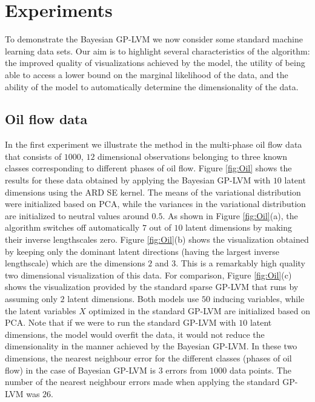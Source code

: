 \documentclass[twoside,times]{article}
\begin{document}
\section{Experiments  \label{sec:experiments}} 

To demonstrate the Bayesian GP-LVM 
we now consider some standard machine learning data sets. Our aim is
 to highlight several characteristics of the algorithm: the improved quality of
visualizations achieved by the model, the utility of being able to
access a lower bound on the marginal likelihood of the data, and the
ability of the model to automatically determine the dimensionality of
the data. 

\subsection{Oil flow data}

In the first experiment we illustrate the method in the multi-phase oil
flow data \citep{Bishop:oil93} that consists of $1000$, $12$ 
dimensional observations belonging to three known classes
corresponding to different phases of oil flow.   
Figure \ref{fig:Oil} shows the results for these  data obtained
by applying the Bayesian GP-LVM with $10$ latent dimensions using the ARD SE
kernel. The means of the variational distribution were initialized
based on PCA, while the variances in the variational distribution are 
initialized to neutral values around $0.5$. As shown in Figure
\ref{fig:Oil}(a), the algorithm switches
off automatically $7$ out of $10$ latent dimensions by making their 
inverse lengthscales zero. Figure \ref{fig:Oil}(b) shows the
visualization obtained by keeping only the 
dominant latent directions (having the largest inverse lengthscale)
which are the dimensions $2$ and $3$. This is a remarkably high quality two
dimensional visualization of this data. For comparison, Figure
\ref{fig:Oil}(c) shows the visualization provided by the standard sparse
GP-LVM that runs by assuming only $2$ latent dimensions. 
Both models use $50$ inducing variables, while the latent variables
$X$ optimized in the standard GP-LVM are initialized based on PCA. 
Note that if we were to run the standard GP-LVM with $10$ latent 
dimensions, the model would overfit the data, it would not reduce the 
dimensionality in the manner achieved by the Bayesian GP-LVM. In these 
two dimensions, the nearest neighbour error for the different classes 
(phases of oil flow) in the case of Bayesian GP-LVM is 3 errors from
$1000$ data points. The number of the nearest neighbour errors made
when applying the standard GP-LVM was $26$. 
\end{document}

